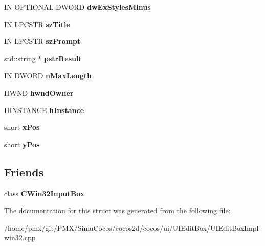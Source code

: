 \begin{DoxyCompactItemize}
IN O\+P\+T\+I\+O\+N\+AL D\+W\+O\+RD {\bfseries dw\+Ex\+Styles\+Minus}
\item 
\mbox{\label{structWIN32INPUTBOX__PARAM_a7a03228429354d28646df2242bb0b2d3}} 
IN L\+P\+C\+S\+TR {\bfseries sz\+Title}
\item 
\mbox{\label{structWIN32INPUTBOX__PARAM_a653dc4f7327308b173a63bbec6d49dbe}} 
IN L\+P\+C\+S\+TR {\bfseries sz\+Prompt}
\item 
\mbox{\label{structWIN32INPUTBOX__PARAM_abbbb36dd830235210aba6b098da92377}} 
std\+::string $\ast$ {\bfseries pstr\+Result}
\item 
\mbox{\label{structWIN32INPUTBOX__PARAM_a1a9d9dc3aa41a825c82bbd426ac5edc5}} 
IN D\+W\+O\+RD {\bfseries n\+Max\+Length}
\item 
\mbox{\label{structWIN32INPUTBOX__PARAM_a34f86fedcadc3efdb09d6e38ef887bcc}} 
H\+W\+ND {\bfseries hwnd\+Owner}
\item 
\mbox{\label{structWIN32INPUTBOX__PARAM_ac9a33a9fc268b0d19669f7901c1e739e}} 
H\+I\+N\+S\+T\+A\+N\+CE {\bfseries h\+Instance}
\item 
\mbox{\label{structWIN32INPUTBOX__PARAM_ae3c6cd3beef1be586136e9b265a0bcab}} 
short {\bfseries x\+Pos}
\item 
\mbox{\label{structWIN32INPUTBOX__PARAM_afc50be3c085d7a8a81e77f6c3f8c28f0}} 
short {\bfseries y\+Pos}
\end{DoxyCompactItemize}
\subsection*{Friends}
\begin{DoxyCompactItemize}
\item 
\mbox{\label{structWIN32INPUTBOX__PARAM_a78cf1d7a6f63d24064db5b20c5adee15}} 
class {\bfseries C\+Win32\+Input\+Box}
\end{DoxyCompactItemize}


The documentation for this struct was generated from the following file\+:\begin{DoxyCompactItemize}
\item 
/home/pmx/git/\+P\+M\+X/\+Simu\+Cocos/cocos2d/cocos/ui/\+U\+I\+Edit\+Box/U\+I\+Edit\+Box\+Impl-\/win32.\+cpp\end{DoxyCompactItemize}
